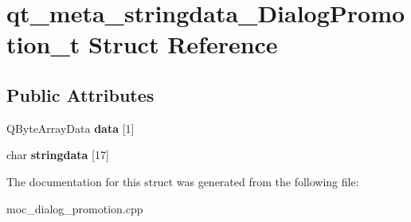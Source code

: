 \hypertarget{structqt__meta__stringdata__DialogPromotion__t}{\section{qt\-\_\-meta\-\_\-stringdata\-\_\-\-Dialog\-Promotion\-\_\-t Struct Reference}
\label{structqt__meta__stringdata__DialogPromotion__t}
}
\subsection*{Public Attributes}
\begin{DoxyCompactItemize}
\item 
\hypertarget{structqt__meta__stringdata__DialogPromotion__t_aeb0c41257553331aba08a115178d031d}{Q\-Byte\-Array\-Data {\bfseries data} \mbox{[}1\mbox{]}}\label{structqt__meta__stringdata__DialogPromotion__t_aeb0c41257553331aba08a115178d031d}

\item 
\hypertarget{structqt__meta__stringdata__DialogPromotion__t_a0bb0ad77a0d91e8352a50dfa882fb80e}{char {\bfseries stringdata} \mbox{[}17\mbox{]}}\label{structqt__meta__stringdata__DialogPromotion__t_a0bb0ad77a0d91e8352a50dfa882fb80e}

\end{DoxyCompactItemize}


The documentation for this struct was generated from the following file\-:\begin{DoxyCompactItemize}
\item 
moc\-\_\-dialog\-\_\-promotion.\-cpp\end{DoxyCompactItemize}
